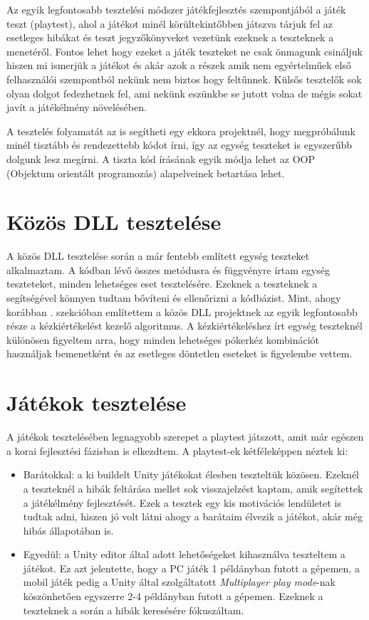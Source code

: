 \documentclass[]{thesis-ekf}
\theoremstyle{definition}
\theoremstyle{remark}
\begin{document}
Az egyik legfontosabb tesztelési módszer játékfejlesztés szempontjából a játék teszt (playtest), ahol a játékot minél körültekintőbben játszva tárjuk fel az esetleges hibákat és teszt jegyzőkönyveket vezetünk ezeknek a teszteknek a menetéről. Fontos lehet hogy ezeket a játék teszteket ne csak önmagunk csináljuk hiszen mi ismerjük a játékot és akár azok a részek amik nem egyértelműek első felhasználói szempontból nekünk nem biztos hogy feltűnnek. Külsős tesztelők sok olyan dolgot fedezhetnek fel, ami nekünk eszünkbe se jutott volna de mégis sokat javít a játékélmény növelésében.

A tesztelés folyamatát az is segítheti egy ekkora projektnél, hogy megpróbálunk minél tisztább és rendezettebb kódot írni, így az egység teszteket is egyszerűbb dolgunk lesz megírni. A tiszta kód írásának egyik módja lehet az OOP (Objektum orientált programozás) alapelveinek betartása lehet.

\section{Közös DLL tesztelése}

A közös DLL tesztelése során a már fentebb említett egység teszteket alkalmaztam. A kódban lévő összes metódusra és függvényre írtam egység teszteteket, minden lehetséges eset tesztelésére. Ezeknek a teszteknek a segítségével könnyen tudtam bővíteni és ellenőrizni a kódbázist. Mint, ahogy korábban . szekcióban említettem a közös DLL projektnek az egyik legfontosabb része a kézkiértékelést kezelő algoritmus. A kézkiértékeléshez írt egység teszteknél különösen figyeltem arra, hogy minden lehetséges pókerkéz kombinációt használjak bemenetként és az esetleges döntetlen eseteket is figyelembe vettem.

\section{Játékok tesztelése}

A játékok tesztelésében legnagyobb szerepet a playtest játszott, amit már egészen a korai fejlesztési fázisban is elkezdtem. A playtest-ek kétféleképpen néztek ki:

\begin{itemize}
	\item Barátokkal: a ki buildelt Unity játékokat élesben teszteltük közösen. Ezeknél a teszteknél a hibák feltárása mellet sok visszajelzést kaptam, amik segítettek a játékélmény fejlesztését. Ezek a tesztek egy kis motivációs lendületet is tudtak adni, hiszen jó volt látni ahogy a barátaim élvezik a játékot, akár még hibás állapotában is.
	\item Egyedül: a Unity editor által adott lehetőségeket kihasználva teszteltem a játékot. Ez azt jelentette, hogy a PC játék 1 példányban futott a gépemen, a mobil játék pedig a Unity által szolgáltatott \emph{Multiplayer play mode}-nak köszönhetően egyszerre 2-4 példányban futott a gépemen. Ezeknek a teszteknek a során a hibák keresésére fókuszáltam. \cite{UnityMultiplayerPlayMode}
\end{itemize}
\end{document}
